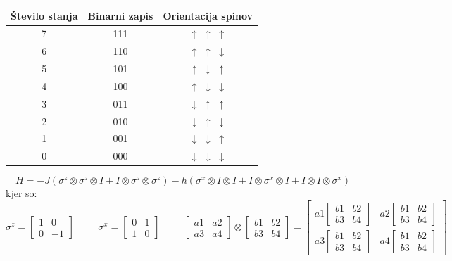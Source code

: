 \documentclass{article}
\begin{document}
\begin{center}
\begin{tabular}{c|c|c}
     Število stanja& Binarni zapis & Orientacija spinov\\
     \hline
     7& 111 & $\uparrow$ $\uparrow$ $\uparrow$\\
     6& 110 & $\uparrow$ $\uparrow$ $\downarrow$\\
     5& 101 & $\uparrow$ $\downarrow$ $\uparrow$\\
     4& 100 & $\uparrow$ $\downarrow$ $\downarrow$\\
     3& 011 & $\downarrow$ $\uparrow$ $\uparrow$\\
     2& 010 & $\downarrow$ $\uparrow$ $\downarrow$\\
     1& 001 & $\downarrow$ $\downarrow$ $\uparrow$\\
     0& 000 & $\downarrow$ $\downarrow$ $\downarrow$
\end{tabular}
\end{center}

\begin{equation}
    H = -J (\sigma^z \otimes \sigma^z \otimes I + I \otimes \sigma^z \otimes \sigma^z) - h (\sigma^x \otimes I \otimes I + I\otimes \sigma^x \otimes I + I \otimes I \otimes \sigma^x)
\end{equation}
kjer so:
\begin{equation}
    \sigma^z = \begin{bmatrix}1 & 0\\0 & -1\end{bmatrix} \hspace{1cm} \sigma^x = \begin{bmatrix}0 & 1\\1 & 0\end{bmatrix} \hspace{1cm} \begin{bmatrix}a1 & a2\\a3 & a4\end{bmatrix} \otimes \begin{bmatrix}b1 & b2\\b3 & b4\end{bmatrix} = \begin{bmatrix}
    a1 \begin{bmatrix}b1 & b2\\b3 & b4\end{bmatrix}  & a2 \begin{bmatrix}b1 & b2\\b3 & b4\end{bmatrix}\\
    a3 \begin{bmatrix}b1 & b2\\b3 & b4\end{bmatrix} & a4 \begin{bmatrix}b1 & b2\\b3 & b4\end{bmatrix}
    \end{bmatrix}
\end{equation}
\end{document}
